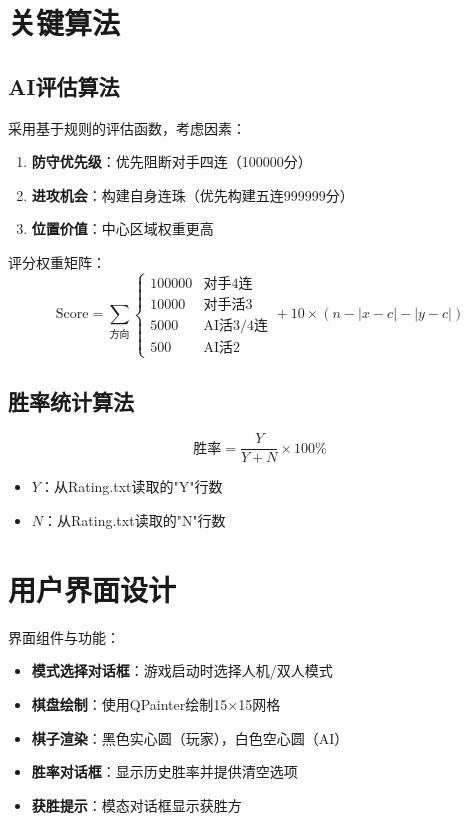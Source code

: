 \documentclass[UTF8]{ctexart}
\begin{document}
\section{关键算法}
\subsection{AI评估算法}
采用基于规则的评估函数，考虑因素：
\begin{enumerate}
    \item \textbf{防守优先级}：优先阻断对手四连（100000分）
    \item \textbf{进攻机会}：构建自身连珠（优先构建五连999999分）
    \item \textbf{位置价值}：中心区域权重更高
\end{enumerate}

评分权重矩阵：
\[
\text{Score} = \sum_{\text{方向}} \begin{cases} 
100000 & \text{对手4连} \\
10000 & \text{对手活3} \\
5000 & \text{AI活3/4连} \\
500 & \text{AI活2}
\end{cases} + 10 \times (n - |x - c| - |y - c|)
\]

\subsection{胜率统计算法}
\[
\text{胜率} = \frac{Y}{Y + N} \times 100\%
\]
\begin{itemize}
    \item $Y$：从Rating.txt读取的"Y"行数
    \item $N$：从Rating.txt读取的"N"行数
\end{itemize}

\section{用户界面设计}
界面组件与功能：
\begin{itemize}
    \item \textbf{模式选择对话框}：游戏启动时选择人机/双人模式
    \item \textbf{棋盘绘制}：使用QPainter绘制15×15网格
    \item \textbf{棋子渲染}：黑色实心圆（玩家），白色空心圆（AI）
    \item \textbf{胜率对话框}：显示历史胜率并提供清空选项
    \item \textbf{获胜提示}：模态对话框显示获胜方
\end{itemize}
\end{document}
